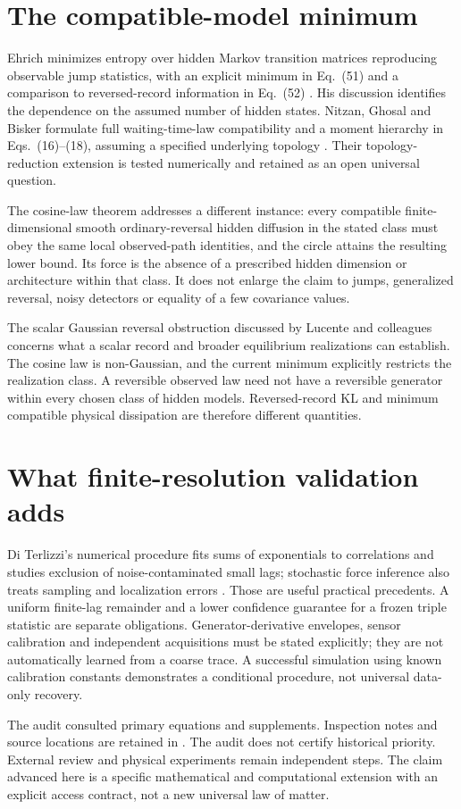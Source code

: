 \section{The compatible-model minimum}
Ehrich minimizes entropy over hidden Markov transition matrices reproducing
observable jump statistics, with an explicit minimum in Eq.~(51) and a
comparison to reversed-record information in Eq.~(52)
\cite{ciEhrich2021}. His discussion identifies the dependence on the assumed
number of hidden states. Nitzan, Ghosal and Bisker formulate full
waiting-time-law compatibility and a moment hierarchy in Eqs.~(16)--(18),
assuming a specified underlying topology \cite{ciNitzan2023}. Their
topology-reduction extension is tested numerically and retained as an open
universal question.

The cosine-law theorem addresses a different instance: every compatible
finite-dimensional smooth ordinary-reversal hidden diffusion in the stated
class must obey the same local observed-path identities, and the circle
attains the resulting lower bound. Its force is the absence of a prescribed
hidden dimension or architecture within that class. It does not enlarge the
claim to jumps, generalized reversal, noisy detectors or equality of a few
covariance values.

The scalar Gaussian reversal obstruction discussed by Lucente and colleagues
\cite{physics-lucente} concerns what a scalar record and broader equilibrium
realizations can establish. The cosine law is non-Gaussian, and the current
minimum explicitly restricts the realization class. A reversible observed
law need not have a reversible generator within every chosen class of hidden
models. Reversed-record KL and minimum compatible physical dissipation are
therefore different quantities.

\section{What finite-resolution validation adds}
Di Terlizzi's numerical procedure fits sums of exponentials to correlations
and studies exclusion of noise-contaminated small lags; stochastic force
inference also treats sampling and localization errors
\cite{ogDiTerlizzi2025,ogFrishman2020}. Those are useful practical precedents.
A uniform finite-lag remainder and a lower confidence guarantee for a frozen
triple statistic are separate obligations. Generator-derivative envelopes,
sensor calibration and independent acquisitions must be stated explicitly;
they are not automatically learned from a coarse trace. A successful
simulation using known calibration constants demonstrates a conditional
procedure, not universal data-only recovery.

The audit consulted primary equations and supplements. Inspection notes and
source locations are retained in .
The audit does not certify historical priority.
External review and physical experiments remain independent steps. The
claim advanced here is a specific mathematical and computational extension
with an explicit access contract, not a new universal law of matter.
